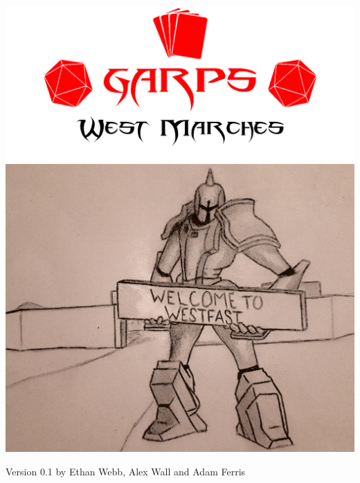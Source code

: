 \begin{onecolumn}
\begin{center}
	
	\includegraphics[width=\textwidth]{img/garps_logo.png}
	\vspace{0.5cm}
	\break
	\includegraphics[width=\linewidth]{img/Welcome_to_Westfast.jpg}
    

	\vfill
	
	{\Large Version 0.1} \newline
	{\Large by Ethan Webb, Alex Wall and Adam Ferris}
	
\end{center}
\end{onecolumn}
